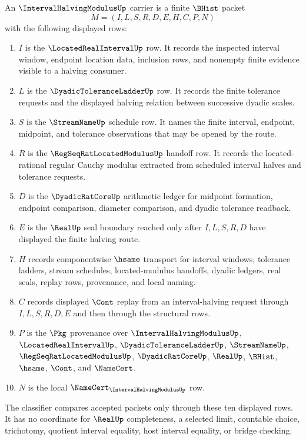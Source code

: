 \begin{definition}
\label{def:interval-halving-modulus-carrier}
An $\IntervalHalvingModulusUp$ carrier is a finite $\BHist$ packet
$$
M=(I,L,S,R,D,E,H,C,P,N)
$$
with the following displayed rows:
\begin{enumerate}
\item $I$ is the $\LocatedRealIntervalUp$ row. It records the inspected interval window, endpoint location data, inclusion rows, and nonempty finite evidence visible to a halving consumer.
\item $L$ is the $\DyadicToleranceLadderUp$ row. It records the finite tolerance requests and the displayed halving relation between successive dyadic scales.
\item $S$ is the $\StreamNameUp$ schedule row. It names the finite interval, endpoint, midpoint, and tolerance observations that may be opened by the route.
\item $R$ is the $\RegSeqRatLocatedModulusUp$ handoff row. It records the located-rational regular Cauchy modulus extracted from scheduled interval halves and tolerance requests.
\item $D$ is the $\DyadicRatCoreUp$ arithmetic ledger for midpoint formation, endpoint comparison, diameter comparison, and dyadic tolerance readback.
\item $E$ is the $\RealUp$ seal boundary reached only after $I,L,S,R,D$ have displayed the finite halving route.
\item $H$ records componentwise $\hsame$ transport for interval windows, tolerance ladders, stream schedules, located-modulus handoffs, dyadic ledgers, real seals, replay rows, provenance, and local naming.
\item $C$ records displayed $\Cont$ replay from an interval-halving request through $I,L,S,R,D,E$ and then through the structural rows.
\item $P$ is the $\Pkg$ provenance over $\IntervalHalvingModulusUp$, $\LocatedRealIntervalUp$, $\DyadicToleranceLadderUp$, $\StreamNameUp$, $\RegSeqRatLocatedModulusUp$, $\DyadicRatCoreUp$, $\RealUp$, $\BHist$, $\hsame$, $\Cont$, and $\NameCert$.
\item $N$ is the local $\NameCert_{\IntervalHalvingModulusUp}$ row.
\end{enumerate}
The classifier compares accepted packets only through these ten displayed rows. It has no coordinate for $\RealUp$ completeness, a selected limit, countable choice, trichotomy, quotient interval equality, host interval equality, or bridge checking.
\end{definition}

